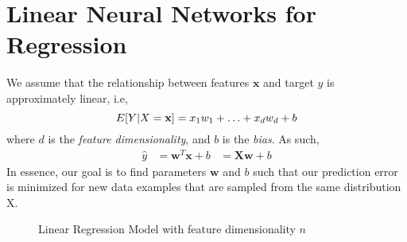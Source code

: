 \documentclass[a4paper,12pt]{article}
\theoremstyle{definition}
\begin{document}
\section{Linear Neural Networks for Regression}
We assume that the relationship between features $\mathbf{x}$ and target $y$ is approximately linear, i.e,
\begin{equation}
    E[Y|X=\mathbf{x}] = x_1w_1 + \ldots + x_dw_d + b \\
\end{equation}
where $d$ is the \textit{feature dimensionality}, and $b$ is the \textit{bias}. As such,
\begin{equation}
    \begin{aligned}
        \hat{y} & = \mathbf{w}^T\mathbf{x} + b
                & = \mathbf{Xw} + b
    \end{aligned}
\end{equation}
In essence, our goal is to find parameters $\mathbf{w}$ and $b$ such that our prediction error is
minimized for new data examples that are sampled from the same distribution X.
\begin{figure}[h]
    \centering
    \caption{Linear Regression Model with feature dimensionality $n$}
\end{figure}
\end{document}
